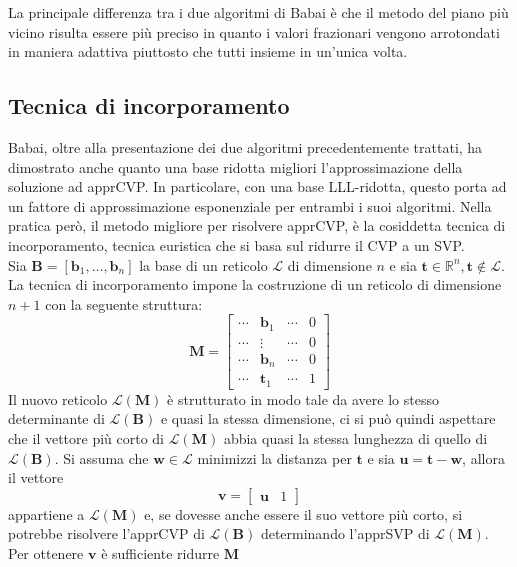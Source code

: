 La principale differenza tra i due algoritmi di Babai è che il metodo del piano più vicino
risulta essere più preciso in quanto i valori frazionari vengono arrotondati in maniera
adattiva piuttosto che tutti insieme in un'unica volta.  

\subsection{Tecnica di incorporamento}
\label{sec:embedding}
Babai, oltre alla presentazione dei due algoritmi precedentemente trattati, ha dimostrato
anche quanto una base ridotta migliori l'approssimazione della soluzione ad apprCVP.
In particolare, con una base LLL-ridotta, questo porta ad un fattore di approssimazione
esponenziale per entrambi i suoi algoritmi. Nella pratica però, il metodo migliore per 
risolvere apprCVP, è la cosiddetta tecnica di
incorporamento\cite{Galbraith18}, tecnica euristica che si basa sul ridurre il CVP a un SVP.  
\\
Sia $\mathbf{B} = [\mathbf{b}_1,\dots, \mathbf{b}_n]$ la base di un reticolo $\mathcal{L}$
di dimensione $n$ e sia $\mathbf{t} \in \mathbb{R}^n, \mathbf{t} \notin \mathcal{L}$. 
La tecnica di incorporamento impone la costruzione di un reticolo di dimensione $n+1$ con
la seguente struttura:
\[
    \mathbf{M} =
    \begin{bmatrix}
        \cdots & \mathbf{b}_1 & \cdots & 0\\
        \cdots & \vdots &  \cdots &  0\\
        \cdots & \mathbf{b}_n & \cdots & 0\\
        \cdots & \mathbf{t}_1 & \cdots & 1
    \end{bmatrix}
\]
Il nuovo reticolo $\mathcal{L}(\mathbf{M})$ è strutturato in modo tale da avere lo stesso 
determinante di $\mathcal{L}(\mathbf{B})$ e quasi la stessa dimensione, ci si può quindi 
aspettare che il vettore più corto di $\mathcal{L}(\mathbf{M})$ abbia quasi la stessa 
lunghezza di quello di $\mathcal{L}(\mathbf{B})$. Si assuma che $\mathbf{w} \in \mathcal{L}$
minimizzi la distanza per $\mathbf{t}$ e sia $\mathbf{u} = \mathbf{t}-\mathbf{w}$, allora il vettore
\[
    \mathbf{v} =
    \begin{bmatrix}
        \mathbf{u} & 1
    \end{bmatrix}
\]
appartiene a $\mathcal{L}(\mathbf{M})$ e, se dovesse anche essere il suo vettore più corto, si 
potrebbe risolvere l'apprCVP di $\mathcal{L(\mathbf{B})}$ determinando l'apprSVP di $\mathcal{L}(\mathbf{M})$.
Per ottenere $\mathbf{v}$ è sufficiente ridurre $\mathbf{M}$
